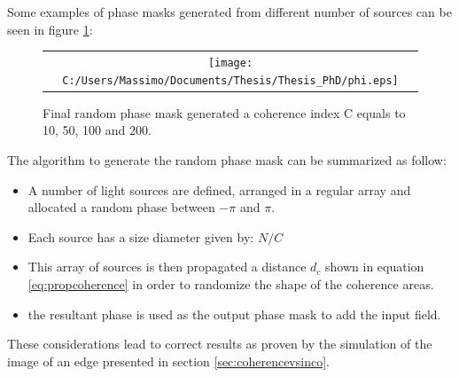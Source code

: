 Some examples of phase masks generated from different number of sources can be seen in figure \ref{fig:phasemask3}:
\begin{figure}[H]
	\begin{center}
		\begin{tabular}{c}
			\texttt{[image: C:/Users/Massimo/Documents/Thesis/Thesis\_PhD/phi.eps]}
		\end{tabular}
	\end{center}
	\caption{ \label{fig:phasemask3} 
		Final random phase mask generated a coherence index C equals to 10, 50, 100 and 200. }
\end{figure} 
The algorithm to generate the random phase mask can be summarized as follow:
\begin{itemize}
\item A number of light sources are defined, arranged in a regular array and allocated a random phase between $-\pi$ and $\pi$. 
 \item Each source has a size diameter given by: $N/C$
 \item This array of sources is then propagated a distance $d_c$ shown in equation \ref{eq:propcoherence} in order to randomize the shape of the coherence areas.
 \item the resultant phase is used as the output phase mask to add the input field.
\end{itemize}
These considerations lead to correct results as proven by the simulation of the image of an edge presented in section \ref{sec:coherencevsinco}.
\newpage
